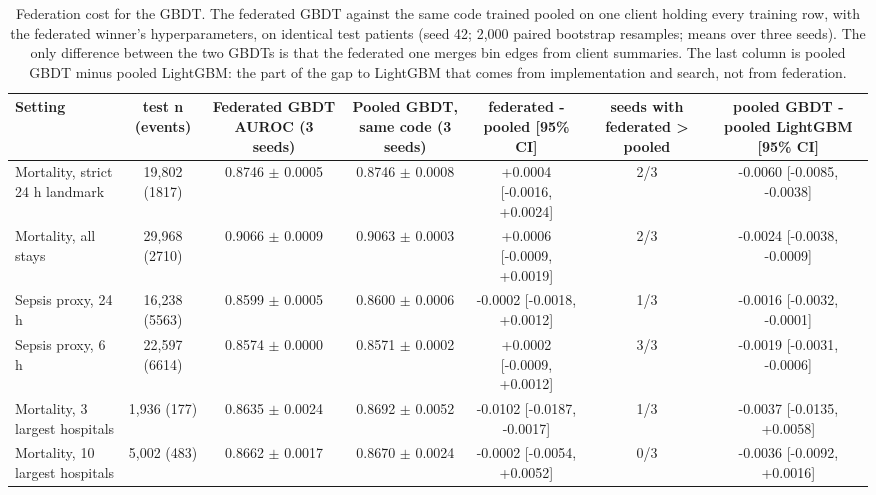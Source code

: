 \begin{table}[t]
\centering\small
\caption{Federation cost for the GBDT. The federated GBDT against the same code trained pooled on one client holding every training row, with the federated winner's hyperparameters, on identical test patients (seed 42; 2,000 paired bootstrap resamples; means over three seeds). The only difference between the two GBDTs is that the federated one merges bin edges from client summaries. The last column is pooled GBDT minus pooled LightGBM: the part of the gap to LightGBM that comes from implementation and search, not from federation.}\label{tab:gbdtfederationcost}
\begin{tabular}{lcccccc}
\toprule
Setting & test n (events) & Federated GBDT AUROC (3 seeds) & Pooled GBDT, same code (3 seeds) & federated - pooled [95\% CI] & seeds with federated > pooled & pooled GBDT - pooled LightGBM [95\% CI] \\
\midrule
Mortality, strict 24 h landmark & 19,802 (1817) & 0.8746 $\pm$ 0.0005 & 0.8746 $\pm$ 0.0008 & +0.0004 [-0.0016, +0.0024] & 2/3 & -0.0060 [-0.0085, -0.0038] \\
Mortality, all stays & 29,968 (2710) & 0.9066 $\pm$ 0.0009 & 0.9063 $\pm$ 0.0003 & +0.0006 [-0.0009, +0.0019] & 2/3 & -0.0024 [-0.0038, -0.0009] \\
Sepsis proxy, 24 h & 16,238 (5563) & 0.8599 $\pm$ 0.0005 & 0.8600 $\pm$ 0.0006 & -0.0002 [-0.0018, +0.0012] & 1/3 & -0.0016 [-0.0032, -0.0001] \\
Sepsis proxy, 6 h & 22,597 (6614) & 0.8574 $\pm$ 0.0000 & 0.8571 $\pm$ 0.0002 & +0.0002 [-0.0009, +0.0012] & 3/3 & -0.0019 [-0.0031, -0.0006] \\
Mortality, 3 largest hospitals & 1,936 (177) & 0.8635 $\pm$ 0.0024 & 0.8692 $\pm$ 0.0052 & -0.0102 [-0.0187, -0.0017] & 1/3 & -0.0037 [-0.0135, +0.0058] \\
Mortality, 10 largest hospitals & 5,002 (483) & 0.8662 $\pm$ 0.0017 & 0.8670 $\pm$ 0.0024 & -0.0002 [-0.0054, +0.0052] & 0/3 & -0.0036 [-0.0092, +0.0016] \\
\bottomrule
\end{tabular}
\end{table}

